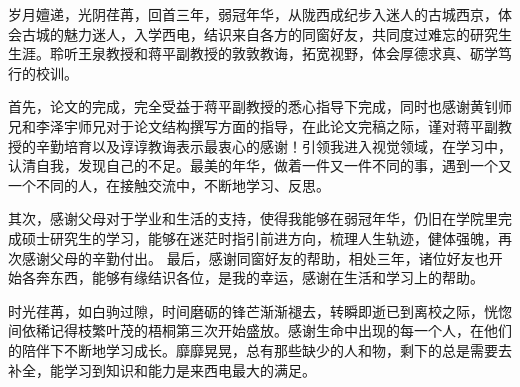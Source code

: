 \begin{thanks}

岁月嬗递，光阴荏苒，回首三年，弱冠年华，从陇西成纪步入迷人的古城西京，体会古城的魅力迷人，入学西电，结识来自各方的同窗好友，共同度过难忘的研究生生涯。聆听王泉教授和蒋平副教授的敦敦教诲，拓宽视野，体会厚德求真、砺学笃行的校训。

首先，论文的完成，完全受益于蒋平副教授的悉心指导下完成，同时也感谢黄钊师兄和李泽宇师兄对于论文结构撰写方面的指导，在此论文完稿之际，谨对蒋平副教授的辛勤培育以及谆谆教诲表示最衷心的感谢！引领我进入视觉领域，在学习中，认清自我，发现自己的不足。最美的年华，做着一件又一件不同的事，遇到一个又一个不同的人，在接触交流中，不断地学习、反思。

其次，感谢父母对于学业和生活的支持，使得我能够在弱冠年华，仍旧在学院里完成硕士研究生的学习，能够在迷茫时指引前进方向，梳理人生轨迹，健体强魄，再次感谢父母的辛勤付出。
最后，感谢同窗好友的帮助，相处三年，诸位好友也开始各奔东西，能够有缘结识各位，是我的幸运，感谢在生活和学习上的帮助。

时光荏苒，如白驹过隙，时间磨砺的锋芒渐渐褪去，转瞬即逝已到离校之际，恍惚间依稀记得枝繁叶茂的梧桐第三次开始盛放。感谢生命中出现的每一个人，在他们的陪伴下不断地学习成长。靡靡晃晃，总有那些缺少的人和物，剩下的总是需要去补全，能学习到知识和能力是来西电最大的满足。

\end{thanks}
